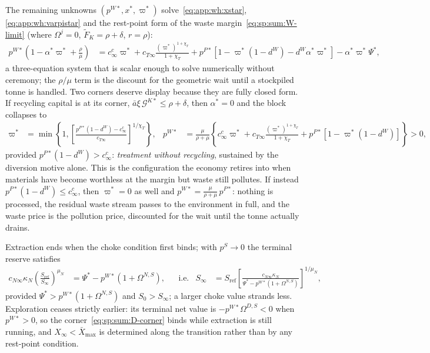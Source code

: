  The remaining unknowns $\left(p^{W*},x^*,\varpi^*\right)$ solve~\eqref{eq:app:wh:xstar}, \eqref{eq:app:wh:varpistar} and the rest-point form of the waste margin~\eqref{eq:sp:sum:W-limit} (where $\Omega^j=0$, $\tilde F_K=\rho+\delta$, $r=\rho$):
\begin{align}
p^{W*}\left(1-\alpha^*\varpi^*+\frac{\rho}{\mu}\right) &= c^{c}_\infty\varpi^*+c_{T\infty}\frac{\left(\varpi^*\right)^{1+\chi_T}}{1+\chi_T}+p^{P*}\left[1-\varpi^*\left(1-d^W\right)-d^W\alpha^*\varpi^*\right]-\alpha^*\varpi^*\Psi^* ,
\label{eq:app:wh:pWstar}
\end{align}
a three-equation system that is scalar enough to solve numerically without ceremony; the $\rho/\mu$ term is the discount for the geometric wait until a stockpiled tonne is handled. Two corners deserve display because they are fully closed form. If recycling capital is at its corner, $\bar a\xi\,\mathcal G^{K*}\le\rho+\delta$, then $\alpha^*=0$ and the block collapses to
\begin{align}
\varpi^* &= \min\left\{1,\left[\frac{p^{P*}\left(1-d^W\right)-c^c_\infty}{c_{T\infty}}\right]^{1/\chi_T}\right\},
&
p^{W*} &= \frac{\mu}{\rho+\mu}\left\{c^c_\infty\varpi^*+c_{T\infty}\frac{\left(\varpi^*\right)^{1+\chi_T}}{1+\chi_T}+p^{P*}\left[1-\varpi^*\left(1-d^W\right)\right]\right\}>0,
\label{eq:app:wh:corner}
\end{align}
provided $p^{P*}\left(1-d^W\right)>c^c_\infty$: \emph{treatment without recycling}, sustained by the diversion motive alone. This is the configuration the economy retires into when materials have become worthless at the margin but waste still pollutes. If instead $p^{P*}\left(1-d^W\right)\le c^c_\infty$, then $\varpi^*=0$ as well and $p^{W*}=\frac{\mu}{\rho+\mu}\,p^{P*}$: nothing is processed, the residual waste stream passes to the environment in full, and the waste price is the pollution price, discounted for the wait until the tonne actually drains.

 Extraction ends when the choke condition first binds; with $p^{S}\to0$ the terminal reserve satisfies
\begin{align}
c_{N\infty}\kappa_N\left(\frac{S_{\mathrm{ref}}}{S_\infty}\right)^{\mu_N} &= \Psi^*-p^{W*}\left(1+\Omega^{N,S}\right),
&&\text{i.e.}
&
S_\infty &= S_{\mathrm{ref}}\left[\frac{c_{N\infty}\kappa_N}{\Psi^*-p^{W*}\left(1+\Omega^{N,S}\right)}\right]^{1/\mu_N},
\label{eq:app:wh:stranded}
\end{align}
provided $\Psi^*>p^{W*}\left(1+\Omega^{N,S}\right)$ and $S_0>S_\infty$; a larger choke value strands less. Exploration ceases strictly earlier: its terminal net value is $-p^{W*}\Omega^{D,S}<0$ when $p^{W*}>0$, so the corner~\eqref{eq:sp:sum:D-corner} binds while extraction is still running, and $X_\infty<\bar X_{\max}$ is determined along the transition rather than by any rest-point condition.

